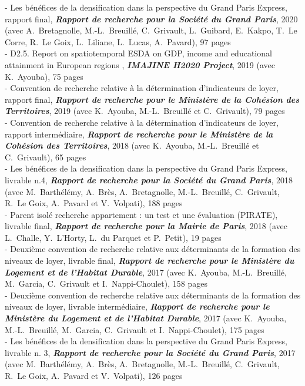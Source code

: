 \documentclass[a4paper,12pt]{article}
\begin{document}
- Les bénéfices de la densification dans la perspective du Grand Paris Express, rapport final, \textit{\textbf{Rapport de recherche pour la Société du Grand Paris}}, 2020 (avec A.~Bretagnolle, M.-L.~Breuillé, C.~Grivault, L.~Guibard, E.~Kakpo, T.~Le Corre, R.~Le Goix, L.~Liliane, L.~Lucas, A.~Pavard), 97 pages \\
- D2.5. Report on spatiotemporal ESDA on GDP, income and educational attainment in European regions , \textit{\textbf{IMAJINE H2020 Project}}, 2019 (avec K.~Ayouba), 75 pages \\
- Convention de recherche relative à la détermination d'indicateurs de loyer, rapport final, \textit{\textbf{Rapport de recherche pour le Ministère de la Cohésion des Territoires}}, 2019 (avec K.~Ayouba, M.-L.~Breuillé et C.~Grivault), 79 pages \\
- Convention de recherche relative à la détermination d'indicateurs de loyer, rapport intermédiaire, \textit{\textbf{Rapport de recherche pour le Ministère de la Cohésion des Territoires}}, 2018 (avec K.~Ayouba, M.-L.~Breuillé et C.~Grivault), 65 pages \\
- Les bénéfices de la densification dans la perspective du Grand Paris Express, livrable n.4, \textit{\textbf{Rapport de recherche pour la Société du Grand Paris}}, 2018 (avec M.~Barthélémy, A.~Brès, A.~Bretagnolle, M.-L.~Breuillé, C.~Grivault, R.~Le Goix, A.~Pavard et V.~Volpati), 188 pages \\
- Parent isolé recherche appartement : un test et une évaluation (PIRATE), livrable final, \textit{\textbf{Rapport de recherche pour la Mairie de Paris}}, 2018 (avec L.~Challe, Y.~L'Horty, L.~du Parquet et P.~Petit), 19 pages \\
- Deuxième convention de recherche relative aux déterminants de la formation des niveaux de loyer, livrable final, \textit{\textbf{Rapport de recherche pour le Ministère du Logement et de l'Habitat Durable}}, 2017 (avec K.~Ayouba, M.-L.~Breuillé, M.~Garcia, C.~Grivault et I.~Nappi-Choulet), 158 pages \\
- Deuxième convention de recherche relative aux déterminants de la formation des niveaux de loyer, livrable intermédiaire, \textit{\textbf{Rapport de recherche pour le Ministère du Logement et de l'Habitat Durable}}, 2017 (avec K.~Ayouba, M.-L.~Breuillé, M.~Garcia, C.~Grivault et I.~Nappi-Choulet), 175 pages \\
- Les bénéfices de la densification dans la perspective du Grand Paris Express, livrable n. 3, \textit{\textbf{Rapport de recherche pour la Société du Grand Paris}}, 2017 (avec M.~Barthélémy, A.~Brès, A.~Bretagnolle, M.-L.~Breuillé, C.~Grivault, R.~Le Goix, A.~Pavard et V.~Volpati), 126 pages \\
\end{document}
